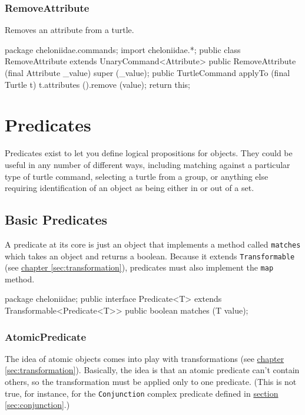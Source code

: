 \documentclass{report}
\newcommand{\Ref}[2]{\hyperref[#2]{#1 \ref*{#2}}}
\begin{document}
\subsection {RemoveAttribute} \label{sec:removeattribute}
        Removes an attribute from a turtle.

\begin{javacode}
package cheloniidae.commands;
import cheloniidae.*;
public class RemoveAttribute extends UnaryCommand<Attribute> {
  public RemoveAttribute (final Attribute _value) {super (_value);}
  public TurtleCommand applyTo (final Turtle t) {
    t.attributes ().remove (value);
    return this;
  }
}
\end{javacode}

\chapter {Predicates} \label{sec:predicates}
    Predicates exist to let you define logical propositions for objects. They could be useful in any number of different ways, including matching against a
    particular type of turtle command, selecting a turtle from a group, or anything else requiring identification of an object as being either in or out of a
    set.

\section {Basic Predicates} \label{sec:basic-predicates}
      A predicate at its core is just an object that implements a method called {\tt matches} which takes an object and returns a boolean. Because it extends
      {\tt Transformable} (see \Ref{chapter}{sec:transformation}), predicates must also implement the {\tt map} method.

\begin{javacode}
package cheloniidae;
public interface Predicate<T> extends Transformable<Predicate<T>> {
  public boolean matches (T value);
}
\end{javacode}

\subsection {AtomicPredicate} \label{sec:atomicpredicate}
        The idea of atomic objects comes into play with transformations (see \Ref{chapter}{sec:transformation}). Basically, the idea is that an atomic predicate
        can't contain others, so the transformation must be applied only to one predicate. (This is not true, for instance, for the {\tt Conjunction} complex
        predicate defined in \Ref{section}{sec:conjunction}.)
\end{document}
